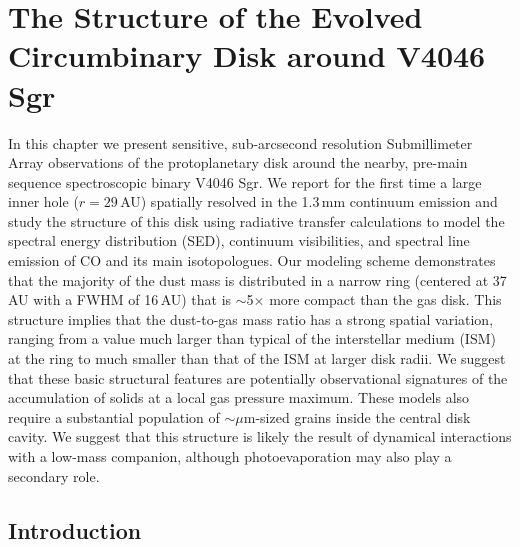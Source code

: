 
\chapter{The Structure of the Evolved Circumbinary Disk around V4046 Sgr}{\label{chap:v4046sgr_structure}

In this chapter we present sensitive, sub-arcsecond resolution Submillimeter Array observations 
of the protoplanetary disk around the nearby, pre-main sequence spectroscopic 
binary V4046 Sgr.  We report for the first time a large inner hole ($r=29$\,AU) 
spatially resolved in the 1.3\,mm continuum emission and study the structure of 
this disk using radiative transfer calculations to model the spectral energy
distribution (SED), continuum visibilities, and spectral line emission of CO and
its main isotopologues.  Our modeling scheme demonstrates that the majority of 
the dust mass is distributed in a narrow ring (centered at 37\,AU with a FWHM of
16\,AU) that is $\sim$5$\times$ more compact than the gas disk.  This structure 
implies that the dust-to-gas mass ratio has a strong spatial variation, ranging 
from a value much larger than typical of the interstellar medium (ISM) at the 
ring to much smaller than that of the ISM at larger disk radii.  We suggest that
these basic structural features are potentially observational signatures of the 
accumulation of solids at a local gas pressure maximum.  These models also 
require a substantial population of $\sim$$\mu$m-sized grains inside the central
disk cavity.  We suggest that this structure is likely the result of dynamical 
interactions with a low-mass companion, although photoevaporation may also play 
a secondary role.


\section{Introduction} \label{sec:intro}

}
